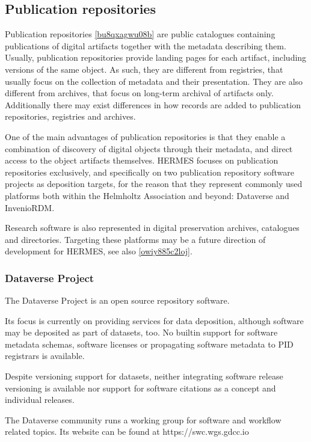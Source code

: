 \documentclass{article}
\begin{document}
\subsection{Publication repositories}\label{px3vrgozgpce}
Publication repositories \ref{bu8qxagwu08b} are public catalogues containing publications of digital artifacts together with the metadata describing them. Usually, publication repositories provide landing pages for each artifact, including versions of the same object. As such, they are different from registries, that usually focus on the collection of metadata and their presentation. They are also different from archives, that focus on long-term archival of artifacts only. Additionally there may exist differences in how records are added to publication repositories, registries and archives.

One of the main advantages of publication repositories is that they enable a combination of discovery of digital objects through their metadata, and direct access to the object artifacts themselves. HERMES focuses on publication repositories exclusively, and specifically on two publication repository software projects as deposition targets, for the reason that they represent commonly used platforms both within the Helmholtz Association and beyond: Dataverse and InvenioRDM.

Research software is also represented in digital preservation archives, catalogues and directories. Targeting these platforms may be a future direction of development for HERMES, see also \ref{owiy885c2loj}.



\subsubsection{Dataverse Project}\label{adb4j1s8jlul}
The Dataverse Project is an open source repository software.

Its focus is currently on providing services for data deposition, although software may be deposited as part of datasets, too. No builtin support for software metadata schemas, software licenses or propagating software metadata to PID registrars is available.

Despite versioning support for datasets, neither integrating software release versioning is available nor support for software citations as a concept and individual releases.

The Dataverse community runs a working group for software and workflow related topics. Its website can be found at https://swc.wgs.gdcc.io
\end{document}
